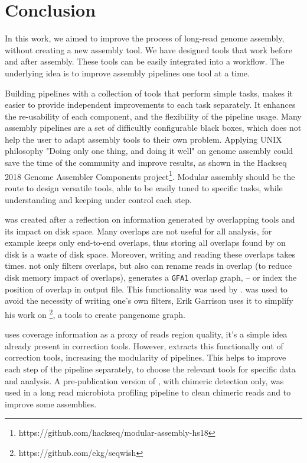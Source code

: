 \documentclass[main.tex]{subfiles}
\begin{document}
\chapter{Conclusion}

In this work, we aimed to improve the process of long-read genome assembly, without creating a new assembly tool. We have designed tools that work before and after assembly. These tools can be easily integrated into a workflow. The underlying idea is to improve assembly pipelines one tool at a time.

Building pipelines with a collection of tools that perform simple tasks, makes it easier to provide independent improvements to each task separately. It enhances the re-usability of each component, and the flexibility of the pipeline usage. Many assembly pipelines are a set of difficultly configurable black boxes, which does not help the user to adapt assembly tools to their own problem. Applying UNIX philosophy "Doing only one thing, and doing it well" on genome assembly could save the time of the community and improve results, as shown in the Hackseq 2018 Genome Assembler Components project\footnote{https://github.com/hackseq/modular-assembly-hs18}. Modular assembly should be the route to design versatile tools, able to be easily tuned to specific tasks, while understanding and keeping under control each step.

\fpa was created after a reflection on information generated by overlapping tools and its impact on disk space. Many overlaps are not useful for all analysis, for example \miniasm keeps only end-to-end overlaps, thus storing all overlaps found by \minimap on disk is a waste of disk space. Moreover, writing and reading these overlaps takes times. \fpa not only filters overlaps, but also can rename reads in overlap (to reduce disk memory impact of overlaps), generates a \texttt{GFA1} overlap graph, -- or index the position of overlap in output file. This functionality was used by \consent \cite{CONSENT}. \fpa was used to avoid the necessity of writing one's own filters, Erik Garrison uses it to simplify his work on \footnote{https://github.com/ekg/seqwish}, a tools to create pangenome graph.

\yacrd uses coverage information as a proxy of reads region quality, it's a simple idea already present in correction tools. However, \yacrd extracts this functionally out of correction tools, increasing the modularity of pipelines. This helps to improve each step of the pipeline separately, to choose the relevant tools for specific data and analysis. A pre-publication version of \yacrd, with chimeric detection only, was used in a long read microbiota profiling pipeline to clean chimeric reads \cite{cite_yacrd} and to improve some \flye assemblies. 
\end{document}
